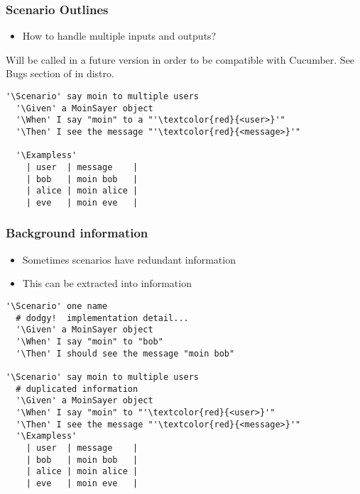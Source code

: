 \documentclass[10pt]{vcs_beamer}
\newcommand{\Background}{\color{BlueViolet}{Background:}}
\newcommand{\Scenario}{\color{BlueViolet}{Scenario:}}
\newcommand{\ScenarioOutline}{\color{BlueViolet}{Scenario Outline:}}
\newcommand{\Exampless}{\color{BlueViolet}{Examples:}}
\newcommand{\Given}{\color{DarkOrange}{Given}}
\newcommand{\When}{\color{RoyalBlue}{When}}
\newcommand{\Then}{\color{ForestGreen}{Then}}
\begin{document}
\begin{frame}[fragile]
\frametitle{Scenario Outlines}

\begin{itemize}
    \item How to handle multiple inputs and outputs?
\end{itemize}

Will be called \ttt{\ScenarioOutline} in a future version in order to be
compatible with Cucumber.  See Bugs section of  in distro.

\begin{lstlisting}[escapeinside='']
'\Scenario' say moin to multiple users
  '\Given' a MoinSayer object
  '\When' I say "moin" to a "'\textcolor{red}{<user>}'"
  '\Then' I see the message "'\textcolor{red}{<message>}'"

  '\Exampless'
    | user  | message    |
    | bob   | moin bob   |
    | alice | moin alice |
    | eve   | moin eve   |
\end{lstlisting}

\end{frame}

\begin{frame}[fragile]
\frametitle{Background information}

\begin{itemize}
    \item Sometimes scenarios have redundant information
    \item This can be extracted into \ttt{\Background} information
\end{itemize}

\begin{lstlisting}[escapeinside='']
'\Scenario' one name
  # dodgy!  implementation detail...
  '\Given' a MoinSayer object
  '\When' I say "moin" to "bob"
  '\Then' I should see the message "moin bob"

'\Scenario' say moin to multiple users
  # duplicated information
  '\Given' a MoinSayer object
  '\When' I say "moin" to "'\textcolor{red}{<user>}'"
  '\Then' I see the message "'\textcolor{red}{<message>}'"
  '\Exampless'
    | user  | message    |
    | bob   | moin bob   |
    | alice | moin alice |
    | eve   | moin eve   |
\end{lstlisting}

\end{frame}
\end{document}
